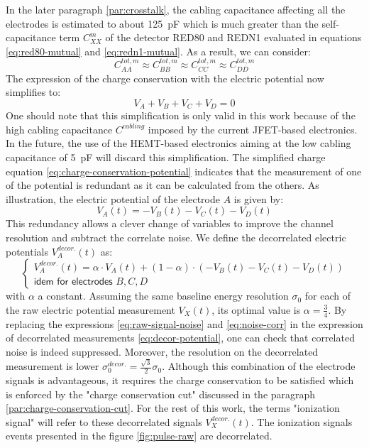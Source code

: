 In the later paragraph \ref{par:crosstalk}, the cabling capacitance affecting all the electrodes is estimated to about \SI{125}{\pico\farad} which is much greater than the self-capacitance term $C_{XX}^m$ of the detector RED80 and REDN1 evaluated in equations \ref{eq:red80-mutual} and \ref{eq:redn1-mutual}. As a result, we can consider:
\begin{equation}
C_{AA}^{tot, m} \approx C_{BB}^{tot, m} \approx C_{CC}^{tot, m} \approx C_{DD}^{tot, m}
\end{equation}
The expression of the charge conservation with the electric potential now simplifies to:
\begin{equation}
\label{eq:charge-conservation-potential}
V_A + V_B + V_C + V_D = 0
\end{equation}
One should note that this simplification is only valid in this work because of the high cabling capacitance $C^{cabling}$ imposed by the current JFET-based electronics. In the future, the use of the HEMT-based electronics aiming at the low cabling capacitance of \SI{5}{\pico\farad} will discard this simplification.
The simplified charge equation \ref{eq:charge-conservation-potential} indicates that the measurement of one of the potential is redundant as it can be calculated from the others. As illustration, the electric potential of the electrode $A$ is given by:
\begin{equation}
V_A(t) = -V_B(t) - V_C(t) - V_D(t)
\end{equation}
This redundancy allows a clever change of variables to improve the channel resolution and subtract the correlate noise. We define the decorrelated electric potentials $V_A^{decor.}(t)$ as:
\begin{equation}
\label{eq:decor-potential}
\begin{cases}
V_A^{decor.}(t) = \alpha \cdot V_A(t) + (1-\alpha) \cdot ( -V_B(t) - V_C(t) - V_D(t)) \\
\textsf{idem for electrodes } B, C, D
\end{cases}
\end{equation}
with $\alpha$ a constant. Assuming the same baseline energy resolution $\sigma_0$ for each of the raw electric potential measurement $V_X(t)$, its optimal value is $\alpha=\frac{3}{4}$. By replacing the expressions \ref{eq:raw-signal-noise} and \ref{eq:noise-corr} in the expression of decorrelated measurements \ref{eq:decor-potential}, one can check that correlated noise is indeed suppressed. Moreover, the resolution on the decorrelated measurement is lower $\sigma_0^{decor.} = \frac{\sqrt{3}}{2} \sigma_0$. Although this combination of the electrode signals is advantageous, it requires the charge conservation to be satisfied which is enforced by the "charge conservation cut" discussed in the paragraph \ref{par:charge-conservation-cut}. For the rest of this work, the terms "ionization signal" will refer to these decorrelated signals $V_X^{decor.}(t)$. The ionization signals events presented in the figure \ref{fig:pulse-raw} are decorrelated.

